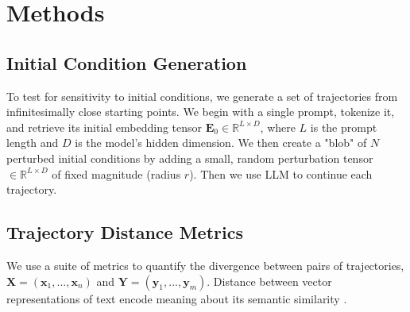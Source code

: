 \documentclass[a4paper,12pt]{article}
\begin{document}
\section{Methods}
\label{sec:methods}

\subsection{Initial Condition Generation}
\label{subsec:init_cond_gen}
To test for sensitivity to initial conditions, we generate a set of trajectories from infinitesimally close starting points. We begin with a single prompt, tokenize it, and retrieve its initial embedding tensor $\mathbf{E}_0 \in \mathbb{R}^{L \times D}$, where $L$ is the prompt length and $D$ is the model's hidden dimension. We then create a "blob" of $N$ perturbed initial conditions by adding a small, random perturbation tensor $\in \mathbb{R}^{L \times D}$ of fixed magnitude (radius $r$). Then we use LLM to continue each trajectory.

\subsection{Trajectory Distance Metrics}
\label{subsec:trajectory_distance_metrics}
We use a suite of metrics to quantify the divergence between pairs of trajectories, $\mathbf{X} = (\mathbf{x}_1, ..., \mathbf{x}_n)$ and $\mathbf{Y} = (\mathbf{y}_1, ..., \mathbf{y}_m)$. Distance between vector representations of text encode meaning about its semantic similarity \cite{text2vec} \cite{reimers2019sentencebertsentenceembeddingsusing} .
\end{document}
